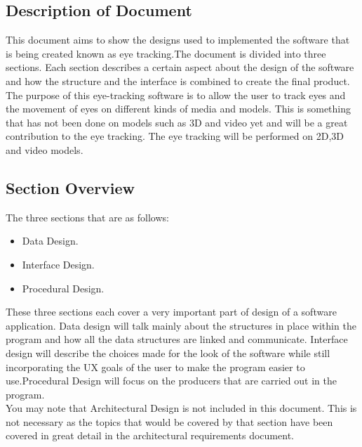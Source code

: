 \subsection{Description of Document}
This document aims to show the designs used to implemented the software that is being created known as eye tracking.The document is divided into three sections. Each section describes a certain aspect about the design of the software and how the structure and the interface is combined to create the final product.
The purpose of this eye-tracking software is to allow the user to track eyes and the movement of eyes on different kinds of media and models. This is something that has not been done on models such as 3D and video yet and will be a great contribution to the eye tracking. The eye tracking will be performed on 2D,3D and video models.
\subsection{Section Overview }
The three sections that are as follows:
\begin{itemize}
\item Data Design.
\item Interface Design.
\item Procedural Design.
\end{itemize}
These three sections each cover a very important part of design of a software application. Data design will talk mainly about the structures in place within the program and how all the data structures are linked and communicate. Interface design will describe the choices made for the look of the software while still incorporating the UX goals of the user to make the program easier to use.Procedural Design will focus on the producers that are carried out in the program.\\
You may note that Architectural Design is not included in this document. This is not necessary as the topics that would be covered by that section have been covered in great detail in the architectural requirements document.